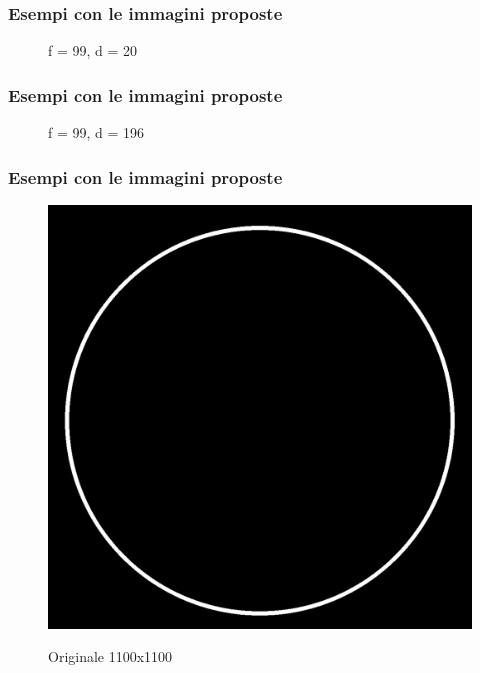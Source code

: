 \documentclass{beamer}
\begin{document}
\begin{frame}
	\frametitle{Esempi con le immagini proposte}
	\begin{figure}
		\caption{f = 99, d = 20}
	\end{figure}

\end{frame}

\begin{frame}
	\frametitle{Esempi con le immagini proposte}
	\begin{figure}
		\caption{f = 99, d = 196}
	\end{figure}

\end{frame}

\begin{frame}
	\frametitle{Esempi con le immagini proposte}
	\begin{figure}
		{\includegraphics[width=.4\linewidth]{../images/circle.png}}
		\caption{Originale 1100x1100}
	\end{figure}
\end{frame}
\end{document}
